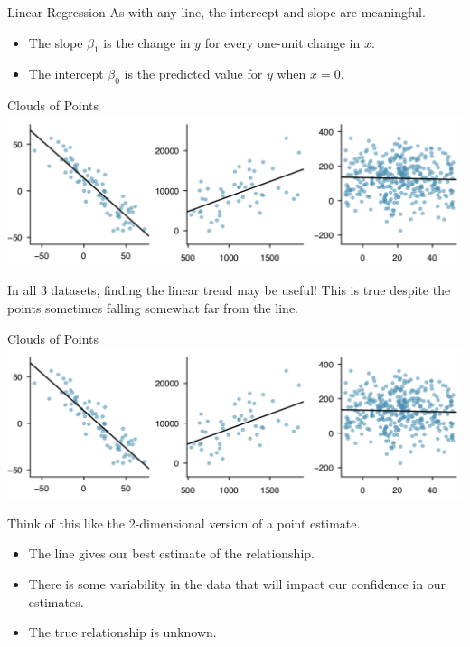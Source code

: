 \begin{frame}{Linear Regression}
    As with any line, the intercept and slope are meaningful.
    \begin{itemize}
        \item The slope $\beta_1$ is the change in $y$ for every one-unit change in $x$.
        \item The intercept $\beta_0$ is the predicted value for $y$ when $x=0$.
    \end{itemize}
\end{frame}

\begin{frame}{Clouds of Points}
        \includegraphics[scale=0.3]{images/ptclouds.png}

    In all 3 datasets, finding the linear trend may be useful! This is true despite the points sometimes falling somewhat far from the line.
\end{frame}

\begin{frame}{Clouds of Points}
    \includegraphics[scale=0.3]{images/ptclouds.png}
    
    Think of this like the 2-dimensional version of a point estimate.
    \begin{itemize}
        \item The line gives our best estimate of the relationship.
        \item There is some variability in the data that will impact our confidence in our estimates.
        \item The true relationship is unknown.
    \end{itemize}
\end{frame}

